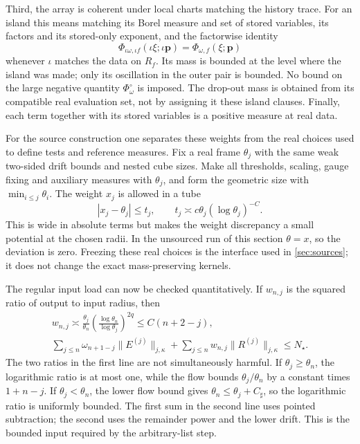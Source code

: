 \documentclass[11pt,letterpaper,reqno]{amsart}
\theoremstyle{definition}
\theoremstyle{remark}
\begin{document}
Third, the array is coherent under
local charts matching the history
trace. For an island this means
matching its Borel measure and set
of stored variables, its factors
and its stored-only exponent, and
the factorwise identity
\[
 \Phi_{\iota\omega,\iota f}
           (\iota\xi;\iota\mathbf p)
                =\Phi_{\omega,f}(\xi;\mathbf p)
\]
whenever $\iota$ matches the data
on $R_f$. Its mass is bounded at
the level where the island was made;
only its oscillation in the outer
pair is bounded. No bound on the
large negative quantity
$\Phi^\circ_\omega$ is imposed.
The drop-out mass is obtained from
its compatible real evaluation set,
not by assigning it these island
clauses. Finally, each term together
with its stored variables is a
positive measure at real data.

For the source construction one
separates these weights from the
real choices used to define tests
and reference measures. Fix a
real frame $\theta_j$ with the
same weak two-sided drift bounds
and nested cube sizes. Make all
thresholds, scaling, gauge fixing
and auxiliary measures with
$\theta_j$, and form the geometric
size with $\min_{i\le j}\theta_i$.
The weight $x_j$ is allowed in
a tube
\[
 |x_j-\theta_j|\le t_j,
             \qquad t_j\asymp c\theta_j(\log\theta_j)^{-C}.
\]
This is wide in absolute terms
but makes the weight discrepancy
a small potential at the chosen
radii. In the unsourced run of
this section $\theta=x$, so
the deviation is zero. Freezing
these real choices is the
interface used in \cref{sec:sources};
it does not change the exact
mass-preserving kernels.

The regular input load can now
be checked quantitatively. If
$w_{n,j}$ is the squared ratio
of output to input radius, then
\begin{equation}\label{eq:xrg-uniform-input}
 \begin{gathered}
 w_{n,j}\asymp
       \frac{\theta_j}{\theta_n}
       \left(\frac{\log\theta_n}{\log\theta_j}\right)^{2q}
                         \le C(n+2-j),\\
 \sum_{j\le n}\omega_{n+1-j}\|E^{(j)}\|_{j,\kappa}
       +\sum_{j\le n}w_{n,j}\|R^{(j)}\|_{j,\kappa}
                           \le N_\star.
 \end{gathered}
\end{equation}
The two ratios in the first line
are not simultaneously harmful.
If $\theta_j\ge\theta_n$, the
logarithmic ratio is at most
one, while the flow bounds
$\theta_j/\theta_n$ by a
constant times $1+n-j$.
If $\theta_j<\theta_n$, the
lower flow bound gives
$\theta_n\le\theta_j+C_\sharp$,
so the logarithmic ratio is
uniformly bounded. The first
sum in the second line uses
pointed subtraction; the second
uses the remainder power and
the lower drift. This is the
bounded input required by the
arbitrary-list step.
\end{document}
